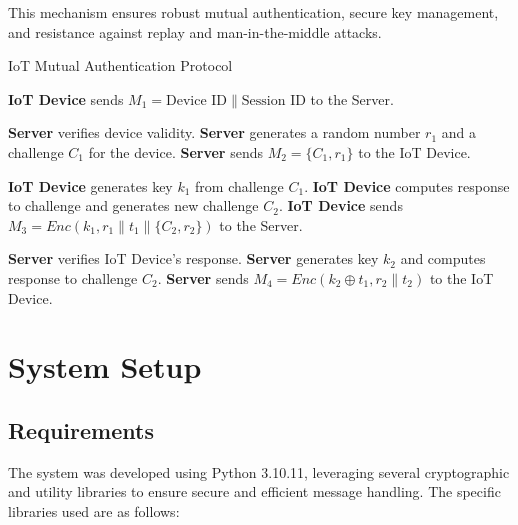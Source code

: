 \documentclass[10pt,twocolumn,letterpaper]{article}
\begin{document}
This mechanism ensures robust mutual authentication, secure key management, and resistance against replay and man-in-the-middle attacks.

\begin{algorithm}
    \caption{IoT Mutual Authentication Protocol}
    \begin{algorithmic}[1]

        \State \textbf{IoT Device} sends $M_1 = \text{Device ID} \parallel \text{Session ID}$ to the Server.

        \State \textbf{Server} verifies device validity.
        \State \textbf{Server} generates a random number $r_1$ and a challenge $C_1$ for the device.
        \State \textbf{Server} sends $M_2 = \{C_1, r_1\}$ to the IoT Device.

        \State \textbf{IoT Device} generates key $k_1$ from challenge $C_1$.
        \State \textbf{IoT Device} computes response to challenge and generates new challenge $C_2$.
        \State \textbf{IoT Device} sends $M_3 = Enc(k_1, r_1 \parallel t_1 \parallel \{C_2,r_2\})$ to the Server.

        \State \textbf{Server} verifies IoT Device’s response.
        \State \textbf{Server} generates key $k_2$ and computes response to challenge $C_2$.
        \State \textbf{Server} sends $M_4 = Enc(k_2 \oplus t_1, r_2 \parallel t_2)$ to the IoT Device.
    \end{algorithmic}
\end{algorithm}

\section{System Setup}
\subsection{Requirements}
The system was developed using Python 3.10.11, leveraging several cryptographic and utility libraries to ensure secure and efficient message handling.
The specific libraries used are as follows:
\end{document}

